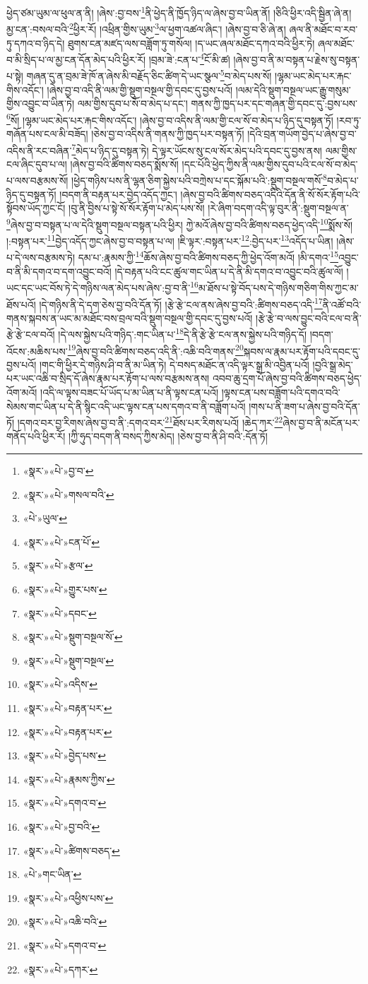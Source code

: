 ཕྱེད་ཙམ་ཡུམ་ལ་ཕུལ་ན་ནི། །ཞེས་:བྱ་བས་\footnote{«སྣར་»«པེ་»བྱ་བ་}ནི་ཕྱེད་ནི་ཁྱོད་ཉིད་ལ་ཞེས་བྱ་བ་ཡིན་ནོ། །ཅིའི་ཕྱིར་འདི་སྦྱིན་ཞེ་ན། མྱ་ངན་:བསལ་བའི་\footnote{«སྣར་»«པེ་»གསལ་བའི་}ཕྱིར་རོ། །འཕྲིན་གྱིས་ཡུམ་\footnote{«པེ་»ཡུལ་}ལ་ཕྱག་འཚལ་ཞིང་། །ཞེས་བྱ་བ་ཅི་ཞེ་ན། ཞལ་ནི་མཐོང་བ་རབ་ཏུ་དཀའ་བ་ཉིད་དེ། ཐུགས་ངན་མཛད་ལས་བཟློག་ཏུ་གསོལ། །ད་ཡང་ཞལ་མཐོང་དཀའ་བའི་ཕྱིར་ཏེ། ཞལ་མཐོང་བ་མི་སྲིད་པ་ལ་མྱ་ངན་དོན་མེད་པའི་ཕྱིར་རོ། །བྲམ་ཟེ་:ངན་པ་\footnote{«སྣར་»«པེ་»ངན་པོ་}ངོ་མི་ཚ། །ཞེས་བྱ་བ་ནི་མ་བསྟན་པ་རྗེས་སུ་བསྟན་པ་སྟེ། གཞན་དུ་ན་བྲམ་ཟེ་ཁོ་ན་ཞེས་མི་བརྗོད་ཅིང་ཚིག་དེ་ཡང་སྩལ་\footnote{«སྣར་»«པེ་»རྩལ་}བ་མེད་པས་སོ། །ལྷམ་ཡང་མེད་པར་རྐང་གིས་འདོང་། །ཞེས་བྱ་བ་འདི་ནི་ལམ་གྱི་སྡུག་བསྔལ་གྱི་དབང་དུ་བྱས་པའོ། །ལམ་དེའི་སྡུག་བསྔལ་ཡང་རྒྱུ་གསུམ་གྱིས་འབྱུང་བ་ཡིན་ཏེ། ལམ་གྱིས་དུབ་པ་སོ་བ་མེད་པ་དང་། གནས་ཀྱི་ཁྱད་པར་དང་གཞན་གྱི་དབང་དུ་:བྱས་པས་\footnote{«སྣར་»«པེ་»གྱུར་པས་}སོ། །ལྷམ་ཡང་མེད་པར་རྐང་གིས་འདོང་། །ཞེས་བྱ་བ་འདིས་ནི་ལམ་གྱི་ངལ་སོ་བ་མེད་པ་ཉིད་དུ་བསྟན་ཏོ། །རབ་ཏུ་གཞོན་པས་ངལ་མི་བཟོད། །ཅེས་བྱ་བ་འདིས་ནི་གནས་ཀྱི་ཁྱད་པར་བསྟན་ཏོ། །དེའི་བྲན་གཡོག་བྱེད་པ་ཞེས་བྱ་བ་འདིས་ནི་རང་བཞིན་\footnote{«སྣར་»«པེ་»དབང་}མེད་པ་ཉིད་དུ་བསྟན་ཏེ། དེ་ལྟར་ཡོངས་སུ་ངལ་སོར་མེད་པའི་དབང་དུ་བྱས་ནས། ལམ་གྱིས་ངལ་ཞིང་དུབ་པ་ལ། །ཞེས་བྱ་བའི་ཚིགས་བཅད་སྨོས་སོ། །དང་པོའི་ཕྱེད་ཀྱིས་ནི་ལམ་གྱིས་དུབ་པའི་ངལ་སོ་བ་མེད་པ་ལས་བརྩམས་སོ། །ཕྱེད་གཉིས་པས་ནི་ལྷན་ཅིག་སྐྱེས་པའི་བཀྲེས་པ་དང་སྐོམ་པའི་:སྡུག་བསྔལ་གསོ་\footnote{«སྣར་»«པེ་»སྡུག་བསྔལ་སོ་}བ་མེད་པ་ཉིད་དུ་བསྟན་ཏོ། །བདག་ནི་བརྟན་པར་བྱེད་འདོད་ཀྱང་། །ཞེས་བྱ་བའི་ཚིགས་བཅད་འདིའི་དོན་ནི་སོ་སོར་རྟོག་པའི་སྟོབས་ཡོད་ཀྱང་ངོ། །བུ་ནི་བྱིས་པ་སྟེ་སོ་སོར་རྟོག་པ་མེད་པས་སོ། །རེ་ཞིག་བདག་འདི་ལྟ་བུར་ནི་:སྡུག་བསྔལ་ན་\footnote{«སྣར་»«པེ་»སྡུག་བསྔལ་}ཞེས་བྱ་བ་བསྟན་པ་ལ་དེའི་སྡུག་བསྔལ་བསྟན་པའི་ཕྱིར། ཀྱེ་མའོ་ཞེས་བྱ་བའི་ཚིགས་བཅད་ཕྱེད་འདི་\footnote{«སྣར་»«པེ་»འདིས་}སྨོས་སོ། །:བསྟན་པར་\footnote{«སྣར་»«པེ་»བརྟན་པར་}བྱེད་འདོད་ཀྱང་ཞེས་བྱ་བ་བསྟན་པ་ལ། །ཇི་ལྟར་:བསྟན་པར་\footnote{«སྣར་»«པེ་»བརྟན་པར་}:བྱེད་པར་\footnote{«སྣར་»«པེ་»བྱེད་པས་}འདོད་པ་ཡིན། །ཞེས་པ་དེ་ལས་བརྩམས་ཏེ། དམ་པ་:རྣམས་ཀྱི་\footnote{«སྣར་»«པེ་»རྣམས་ཀྱིས་}ཆོས་ཞེས་བྱ་བའི་ཚིགས་བཅད་ཀྱི་ཕྱེད་འོག་མའོ། །མི་དགའ་\footnote{«སྣར་»«པེ་»དགའ་བ་}འབྱུང་བ་ནི་མི་དགའ་བ་དག་འབྱུང་བའོ། །དེ་བརྟན་པའི་ངང་ཚུལ་གང་ཡིན་པ་དེ་ནི་མི་དགའ་བ་འབྱུང་བའི་ཚུལ་ལོ། །ཡང་དང་ཡང་བོས་ཏེ་དེ་གཉིས་ལན་མེད་པས་ཞེས་:བྱ་བ་ནི་\footnote{«སྣར་»«པེ་»བྱ་བའི་}མ་ཐོས་པ་སྟེ་བོད་པས་དེ་གཉིས་གཅིག་གིས་ཀྱང་མ་ཐོས་པའོ། །དེ་གཉིས་ནི་དེ་དག་ཅེས་བྱ་བའི་དོན་ཏོ། །རྩེ་རྩེ་ངལ་ནས་ཞེས་བྱ་བའི་:ཚིགས་བཅད་འདི་\footnote{«སྣར་»«པེ་»ཚིགས་བཅད་}ནི་འཚོ་བའི་གནས་སྐབས་ན་ཡང་མ་མཐོང་བས་བྲལ་བའི་སྡུག་བསྔལ་གྱི་དབང་དུ་བྱས་པའོ། །རྩེ་རྩེ་བ་ལས་བྱུང་བའི་ངལ་བ་ནི་རྩེ་རྩེ་ངལ་བའོ། །དེ་ལས་སྐྱེས་པའི་གཉིད་:གང་ཡིན་པ་\footnote{«པེ་»གང་ཡིན་}དེ་ནི་རྩེ་རྩེ་ངལ་ནས་སྐྱེས་པའི་གཉིད་དོ། །བདག་འོངས་:མཆིས་པས་\footnote{«སྣར་»«པེ་»འཕྱིས་པས་}ཞེས་བྱ་བའི་ཚིགས་བཅད་འདི་ནི་:འཆི་བའི་གནས་\footnote{«སྣར་»«པེ་»འཆི་བའི་}སྐབས་ལ་རྣམ་པར་རྟོག་པའི་དབང་དུ་བྱས་པའོ། །གང་གི་ཕྱིར་དེ་གཉིས་ཤི་བ་ནི་མ་ཡིན་ཏེ། དེ་བསད་མཐོང་ན་འདི་ལྟར་སྒྲ་མི་འབྱིན་པའོ། །བྱའི་སྒྲ་མེད་པར་ཡང་འཆི་བ་སྲིད་དོ་ཞེས་རྣམ་པར་རྟོག་པ་ལས་བརྩམས་ནས། འབབ་ཆུ་དྲག་པོ་ཞེས་བྱ་བའི་ཚིགས་བཅད་ཕྱེད་འོག་མའོ། །འདི་ལ་ལྟས་བཟང་པོ་ཡོད་པ་མ་ཡིན་པ་ནི་ལྟས་ངན་པའོ། །ལྟས་ངན་པས་བཟློག་པའི་དགའ་བའི་སེམས་གང་ཡིན་པ་དེ་ནི་སྙིང་འདི་ཡང་ལྟས་ངན་པས་དགའ་བ་ནི་བཟློག་པའོ། །གས་པ་ནི་ཟག་པ་ཞེས་བྱ་བའི་དོན་ཏོ། །དགའ་བར་བྱ་རིགས་ཞེས་བྱ་བ་ནི་:དགའ་བར་\footnote{«སྣར་»«པེ་»དགའ་བ་}ཐོས་པར་རིགས་པའོ། །ཆེད་ཀར་\footnote{«སྣར་»«པེ་»དཀར་}ཞེས་བྱ་བ་ནི་མངོན་པར་གནོད་པའི་ཕྱིར་རོ། །ཀྱི་ཧུད་བདག་ནི་བསད་ཀྱིས་མེད། །ཅེས་བྱ་བ་ནི་ཤི་བའི་:དོན་ཏོ། 